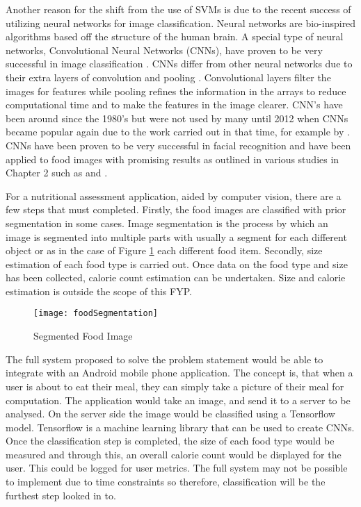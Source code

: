 Another reason for the shift from the use of SVMs is due to the recent success of utilizing neural networks for image classification.
Neural networks are bio-inspired algorithms based off the structure of the human brain.
A special type of neural networks, Convolutional Neural Networks (CNNs), have proven to be very successful in image classification \parencite{krizhevsky2012imagenet}.
CNNs differ from other neural networks due to their extra layers of convolution and pooling \parencite{visualizing}.
Convolutional layers filter the images for features while pooling refines the information in the arrays to reduce computational time and to make the features in the image clearer.
CNN's have been around since the 1980's \parencite{handsOnML} but were not used by many until 2012 when CNNs became popular again due to the work carried out in that time, for example by \parencite{krizhevsky2012imagenet}.
CNNs have been proven to be very successful in facial recognition and have been applied to food images with promising results as outlined in various studies in Chapter 2 such as \parencite{yanaiFood} and \parencite{deepLearning}.

For a nutritional assessment application, aided by computer vision, there are a
few steps that must completed. Firstly, the food images are classified with prior segmentation in some cases.
Image segmentation is the process by which an image is segmented into multiple parts with usually a segment for each different object or as in the case of Figure \ref{fig:foodSegment} each different food item.
Secondly, size estimation of each food type is carried out. Once data on the food type and size has been collected, calorie count estimation can be undertaken. Size and calorie estimation is outside the scope of this FYP.

\begin{figure}[h]
  \centering
  \texttt{[image: foodSegmentation]}
  \caption{Segmented Food Image \parencite{segmentFood}}
  \label{fig:foodSegment}
\end{figure}


The full system proposed to solve the problem statement would be able to integrate with an Android mobile phone application.
The concept is, that when a user is about to eat their meal, they can simply take a picture of their meal for computation.
The application would take an image, and send it to a server to be analysed.
On the server side the image would be classified using a Tensorflow model.
Tensorflow is a machine learning library that can be used to create CNNs.
Once the classification step is completed, the size of each food type would be measured and through this, an overall calorie count would be displayed for the user.
This could be logged for user metrics.
The full system may not be possible to implement due to time constraints so therefore, classification will be the furthest step looked in to.

